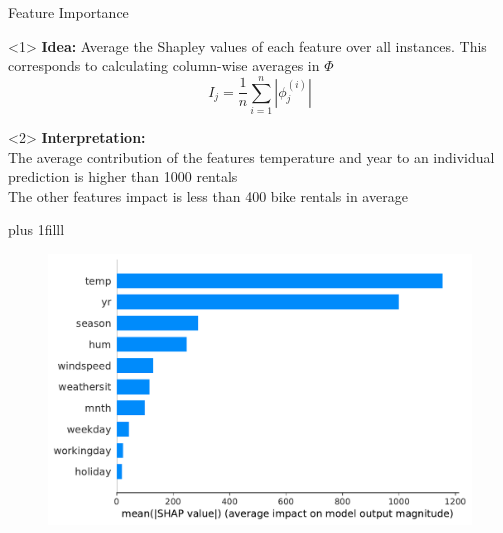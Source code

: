 \documentclass[11pt,compress,t,notes=noshow, aspectratio=169, xcolor=table]{beamer}
\newcommand{\btVFill}{\vskip0pt plus 1filll}
\begin{document}
 \begin{vbframe}{Feature Importance}

\begin{onlyenv}<1>
\textbf{Idea:} Average the Shapley values of each feature over all instances. This corresponds to calculating column-wise averages in $\Phi$
$$
I_{j}=\frac{1}{n} \sum_{i=1}^{n}\left|\phi_{j}^{(i)}\right|
$$
\end{onlyenv}

\begin{onlyenv}<2>
\textbf{Interpretation:}\\
The average contribution of the features temperature and year to an individual prediction is higher than 1000 rentals\\
The other features impact is less than 400 bike rentals in average\\
\end{onlyenv}


\btVFill

\begin{figure}
    \centering
    \includegraphics[width=0.5\columnwidth]{slides/shapley/figure_man/global_shap_fi.pdf}
\end{figure}

\end{vbframe}
 
\end{document}

